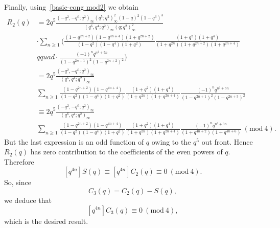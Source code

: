 \documentclass[reqno]{amsart}
\theoremstyle{definition}
\theoremstyle{plain}
\theoremstyle{remark}
\numberwithin{equation}{section}
\newcommand{\Mod}[1]{\ (\mathrm{mod}\ #1)}
\newcommand{\fr}{\frac}
\begin{document}
Finally, using~\eqref{basic-cong mod2} we obtain
\begin{align*}
R_2(q) &= 2 q^5 \fr{(-q^2,-q^6;q^2)_\infty (q^5;q^2)_\infty^2 (1-q)^2(1-q^3)^3}{(q^6,q^4;q^2)_\infty (q;q^2)_\infty^2} \\
&\cdot \sum_{n\geq 1} \Big( \fr{(1-q^{2n+2})(1-q^{4n+4})(1+q^{2n+2})}{(1-q^2)(1-q^4)(1+q^2)} \fr{(1+q^2)(1+q^4)}{(1+q^{2n})(1+q^{2n+2})(1+q^{2n+4})} \\
& qquad \cdot\fr{(-1)^n q^{n^2+5n}}{(1-q^{2n+1})^2(1-q^{2n+2})^2} \Big)\\
&= 2q^5 \fr{(-q^2,-q^6;q^2)_\infty}{(q^6,q^4;q^2)_\infty} \\
&\sum_{n\geq 1}\fr{(1-q^{2n+2})(1-q^{4n+4})}{(1-q^2)(1-q^4)(1+q^2)}
\fr{(1+q^2)(1+q^4)}{(1+q^{2n})(1+q^{2n+4})}\fr{(-1)^n q^{n^2+5n}}{(1-q^{2n+1})^2(1-q^{2n+3})^2} \\
&\equiv 2q^5 \fr{(-q^2,-q^6;q^2)_\infty}{(q^6,q^4;q^2)_\infty} \\
&\sum_{n\geq 1}\fr{(1-q^{2n+2})(1-q^{4n+4})}{(1-q^2)(1-q^4)(1+q^2)}
\fr{(1+q^2)(1+q^4)}{(1+q^{2n})(1+q^{2n+4})}\fr{(-1)^n q^{n^2+5n}}{(1+q^{4n+2})(1+q^{4n+6})} \Mod{4} .
\end{align*}
But the last expression is an odd function of $q$ owing to the $q^5$ out front. Hence $R_2(q)$ has zero contribution to the
coefficients of the even powers of $q$. Therefore
\[
[q^{4n}] S(q) \equiv [q^{4n}] C_2(q) \equiv 0\Mod{4}.
\]
So, since
\[
C_3(q) = C_2(q)-S(q),
\]
we deduce that
\[
[q^{4n}] C_3(q) \equiv 0\Mod{4},
\]
which is the desired result.
%
\end{document}
